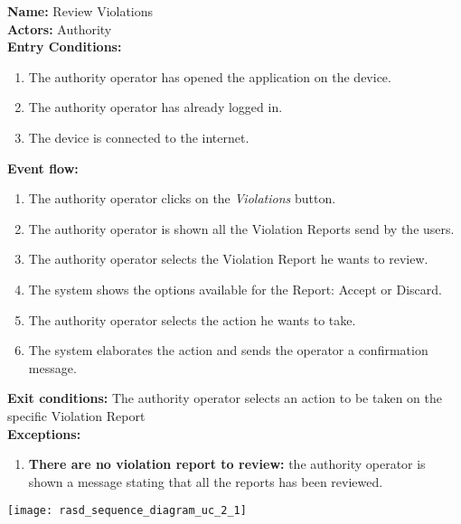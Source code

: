 \begin{usecase}{2.1}
    \textbf{Name:} Review Violations \\
    \textbf{Actors:} Authority \\
    \textbf{Entry Conditions:}
    \begin{enumerate}
        \item The authority operator has opened the application on the device.
        \item The authority operator has already logged in.
        \item The device is connected to the internet.
    \end{enumerate}
    \textbf{Event flow:}
    \begin{enumerate}
        \item The authority operator clicks on the \emph{Violations} button.
        \item The authority operator is shown all the Violation Reports send by
        the users.
        \item The authority operator selects the Violation Report he wants to
        review.
        \item The system shows the options available for the Report: Accept or
        Discard.
        \item The authority operator selects the action he wants to take.
        \item The system elaborates the action and sends the operator a
        confirmation message.
    \end{enumerate}
    \textbf{Exit conditions:} The authority operator selects an action to be
    taken on the specific Violation Report \\
    \textbf{Exceptions:}
    \begin{enumerate}
        \item \textbf{There are no violation report to review:} the authority
        operator is shown a message stating that all the reports has been
        reviewed.
    \end{enumerate}
    \tcblower
    \centering
    \texttt{[image: rasd\_sequence\_diagram\_uc\_2\_1]}
\end{usecase}